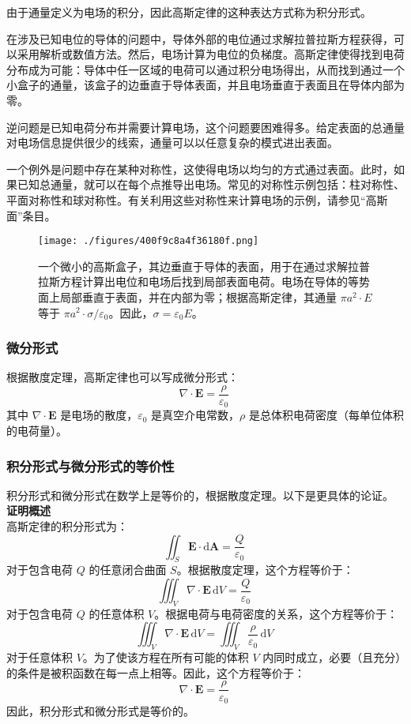 由于通量定义为电场的积分，因此高斯定律的这种表达方式称为积分形式。

在涉及已知电位的导体的问题中，导体外部的电位通过求解拉普拉斯方程获得，可以采用解析或数值方法。然后，电场计算为电位的负梯度。高斯定律使得找到电荷分布成为可能：导体中任一区域的电荷可以通过积分电场得出，从而找到通过一个小盒子的通量，该盒子的边垂直于导体表面，并且电场垂直于表面且在导体内部为零。

逆问题是已知电荷分布并需要计算电场，这个问题要困难得多。给定表面的总通量对电场信息提供很少的线索，通量可以以任意复杂的模式进出表面。

一个例外是问题中存在某种对称性，这使得电场以均匀的方式通过表面。此时，如果已知总通量，就可以在每个点推导出电场。常见的对称性示例包括：柱对称性、平面对称性和球对称性。有关利用这些对称性来计算电场的示例，请参见“高斯面”条目。
\begin{figure}[ht]
\centering
\texttt{[image: ./figures/400f9c8a4f36180f.png]}
\caption{一个微小的高斯盒子，其边垂直于导体的表面，用于在通过求解拉普拉斯方程计算出电位和电场后找到局部表面电荷。电场在导体的等势面上局部垂直于表面，并在内部为零；根据高斯定律，其通量 \( \pi a^2 \cdot E \) 等于 \( \pi a^2 \cdot \sigma / \varepsilon_0 \)。因此，\(\sigma = \varepsilon_0 E\)。} \label{fig_GSDL_4}
\end{figure}
\subsubsection{微分形式}
根据散度定理，高斯定律也可以写成微分形式：
\[
\nabla \cdot \mathbf{E} = \frac{\rho}{\varepsilon_0}~
\]
其中 \(\nabla \cdot \mathbf{E}\) 是电场的散度，\(\varepsilon_0\) 是真空介电常数，\(\rho\) 是总体积电荷密度（每单位体积的电荷量）。
\subsubsection{积分形式与微分形式的等价性}
积分形式和微分形式在数学上是等价的，根据散度定理。以下是更具体的论证。\\
\textbf{证明概述}\\
高斯定律的积分形式为：
\[
\iint_{S} \mathbf{E} \cdot \mathrm{d} \mathbf{A} = \frac{Q}{\varepsilon_0}~
\]
对于包含电荷 \(Q\) 的任意闭合曲面 \(S\)。根据散度定理，这个方程等价于：
\[
\iiint_{V} \nabla \cdot \mathbf{E} \, \mathrm{d} V = \frac{Q}{\varepsilon_0}~
\]
对于包含电荷 \(Q\) 的任意体积 \(V\)。根据电荷与电荷密度的关系，这个方程等价于：
\[
\iiint_{V} \nabla \cdot \mathbf{E} \, \mathrm{d} V = \iiint_{V} \frac{\rho}{\varepsilon_0} \, \mathrm{d} V~
\]
对于任意体积 \(V\)。为了使该方程在所有可能的体积 \(V\) 内同时成立，必要（且充分）的条件是被积函数在每一点上相等。因此，这个方程等价于：
\[
\nabla \cdot \mathbf{E} = \frac{\rho}{\varepsilon_0}~
\]
因此，积分形式和微分形式是等价的。

